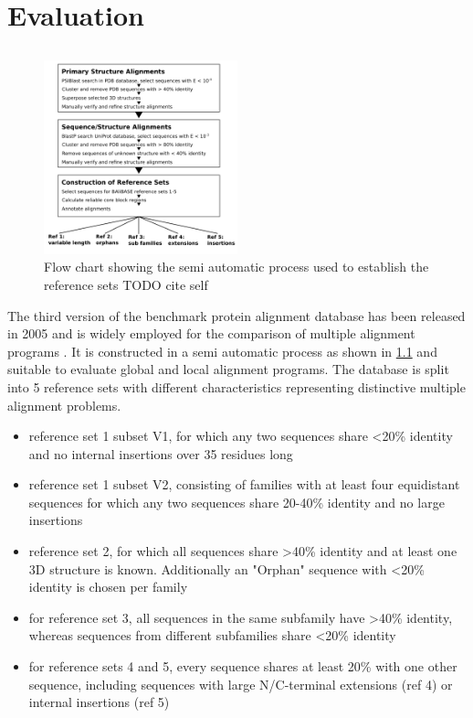 \chapter{Evaluation}

\section{}
\begin{figure}
	\centering
	\includegraphics[width=0.5\textwidth]{./images/balibase.png}
	\caption{Flow chart showing the semi automatic process used to establish the reference sets TODO cite self}
	\label{fig:balibase}
\end{figure}

The third version of the \bb benchmark protein alignment database has been released in 2005 and is widely employed for the comparison of multiple alignment programs \cite{thompson2005balibase, Russell2016}. It is constructed in a semi automatic process as shown in \cref{fig:balibase} and suitable to evaluate global and local alignment programs. The database is split into 5 reference sets with different characteristics representing distinctive multiple alignment problems.



\begin{itemize}
	\item reference set 1 subset V1, for which any two sequences share <20\% identity and no internal insertions over 35 residues long
	\item reference set 1 subset V2, consisting of families with at least four equidistant sequences for which any two sequences share 20-40\% identity and no large insertions
	\item reference set 2, for which all sequences share >40\% identity and at least one 3D structure is known. Additionally an "Orphan" sequence with <20\% identity is chosen per family
	\item for reference set 3, all sequences in the same subfamily have >40\% identity, whereas sequences from different subfamilies share <20\% identity
	\item for reference sets 4 and 5, every sequence shares at least 20\% with one other sequence, including sequences with large N/C-terminal extensions (ref 4) or internal insertions (ref 5)
\end{itemize}

